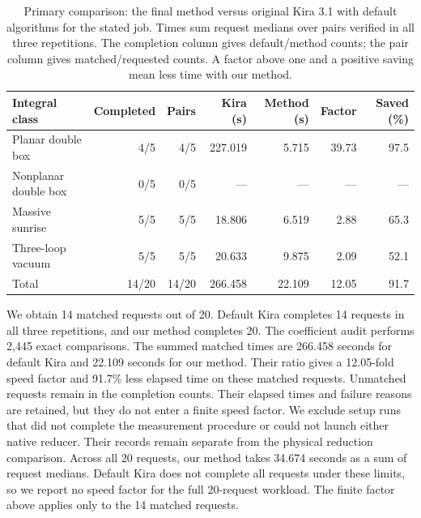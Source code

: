 \begin{table}[!htbp]\centering\small
\caption{Primary comparison: the final method versus original Kira 3.1 with default algorithms for the stated job. Times sum request medians over pairs verified in all three repetitions. The completion column gives default/method counts; the pair column gives matched/requested counts. A factor above one and a positive saving mean less time with our method.}
\label{tab:default-kira-final}
\setlength{\tabcolsep}{4pt}
\begin{tabular}{@{}lrrrrrr@{}}\toprule
Integral class & Completed & Pairs & Kira (s) & Method (s) & Factor & Saved (\%)\\\midrule
Planar double box & 4/5 & 4/5 & 227.019 & 5.715 & 39.73 & 97.5\\
Nonplanar double box & 0/5 & 0/5 & --- & --- & --- & ---\\
Massive sunrise & 5/5 & 5/5 & 18.806 & 6.519 & 2.88 & 65.3\\
Three-loop vacuum & 5/5 & 5/5 & 20.633 & 9.875 & 2.09 & 52.1\\
\midrule
Total & 14/20 & 14/20 & 266.458 & 22.109 & 12.05 & 91.7\\
\bottomrule\end{tabular}
\end{table}
We obtain 14 matched requests out of 20. Default Kira completes 14 requests in all three repetitions, and our method completes 20. The coefficient audit performs 2,445 exact comparisons.
The summed matched times are 266.458 seconds for default Kira and 22.109 seconds for our method. Their ratio gives a 12.05-fold speed factor and 91.7\% less elapsed time on these matched requests.
Unmatched requests remain in the completion counts. Their elapsed times and failure reasons are retained, but they do not enter a finite speed factor.
We exclude setup runs that did not complete the measurement procedure or could not launch either native reducer. Their records remain separate from the physical reduction comparison.
Across all 20 requests, our method takes 34.674 seconds as a sum of request medians.
Default Kira does not complete all requests under these limits, so we report no speed factor for the full 20-request workload. The finite factor above applies only to the 14 matched requests.
